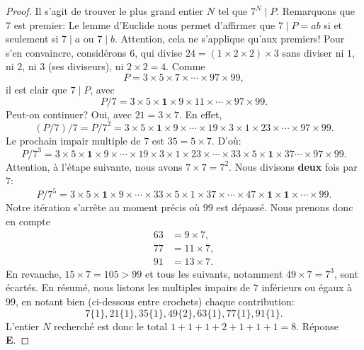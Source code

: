 \begin{proof}
Il s'agit de trouver le plus grand entier $N$ tel que $7^N \mid P$. 
Remarquons que $7$ est premier: Le lemme d'Euclide nous permet d'affirmer que $7 \mid P = a b$ si et seulement si %
$7 \mid a$ ou $ 7 \mid b$. Attention, cela ne s'applique qu'aux premiers! Pour s'en convaincre, considérons $6$, qui divise %
$24 = (1 \times 2 \times 2) \times 3$ sans diviser ni $1$, ni $2$, ni $3$ (ses diviseurs), ni $2 \times 2 = 4$. 
%
Comme
%
\begin{equation}
P = 3 \times 5 \times 7 \times \cdots \times 97 \times 99, 
\end{equation}
%
il est clair que $7 \mid P$, avec 
%
\begin{equation}
P / 7 = 3 \times 5 \times \mathbf{1} \times 9 \times 11 \times \cdots \times 97 \times 99. 
\end{equation}
%
Peut-on continuer?  Oui, avec $21 = 3 \times 7$. En effet, 
%
\begin{equation}
(P / 7) / 7 = P / 7^2 = 3 \times 5 \times \mathbf{1} \times 9 \times \cdots \times 19 \times 3 \times %
1 \times 23 \times \cdots \times 97 \times 99.
\end{equation}
%
Le prochain impair multiple de $7$ est $35 = 5 \times 7$. D'où:
%
\begin{equation}
P/7^{3} = 3 \times 5 \times \mathbf{1}\times 9 \times \cdots \times 19 \times 3 \times %
1 \times 23 \times \cdots \times 33 \times 5 \times \mathbf{1}\times 37\cdots \times 97 \times 99.
\end{equation}
%
Attention, à l'étape suivante, nous avons $7 \times 7=7^{2}$. Nous divisons \textbf{deux} fois par $7$: 
%
\begin{equation}
P/7^{5}=3 \times 5 \times \mathbf{1}\times 9 \times \cdots \times 33 \times 5 \times %
1 \times 37 \times \cdots \times 47 \times \mathbf{1}\times \mathbf{1}\times \cdots \times 99.
\end{equation}
%
Notre itération s'arrête au moment précis où $99$ est dépassé. Nous prenons donc en compte 
%
\begin{align*} 
63 &= 9 \times 7, \\
77 &= 11 \times 7, \\
91 &= 13 \times 7.
\end{align*}
%
En revanche, $15 \times 7=105>99$ et tous les suivants, notamment $49 \times 7 = 7^3$, sont écartés. En résumé, nous listons %
les multiples impairs de $7$ inférieurs ou égaux à $99$, en notant bien (ci-dessous entre crochets) chaque contribution: 
%
\begin{equation}
7 \{1\}, 21 \{1\}, 35 \{1\}, 49 \{2\}, 63 \{1\}, 77 \{1\}, 91 \{1\}. 
\end{equation}
%
L'entier $N$ recherché est donc le total $1+1+1+2+1+1+1 = 8$. Réponse \textbf{E}.
%
\end{proof}